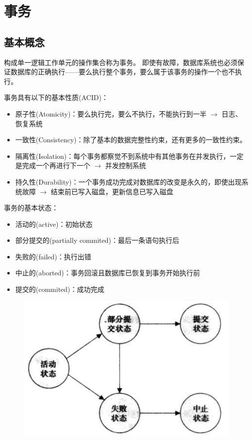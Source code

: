 
\section{事务} %
\subsection{基本概念}
\begin{definition}[事务(transaction)]
构成单一逻辑工作单元的操作集合称为事务。
即使有故障，数据库系统也必须保证数据库的正确执行——要么执行整个事务，要么属于该事务的操作一个也不执行。
\end{definition}

事务具有以下的基本性质(ACID)：
\begin{itemize}
	\item 原子性(Atomicity)：要么执行完，要么不执行，不能执行到一半 $\to$ 日志、恢复系统
	\item 一致性(Consistency)：除了基本的数据完整性约束，还有更多的一致性约束。
	\item 隔离性(Isolation)：每个事务都察觉不到系统中有其他事务在并发执行，一定是完成一个再进行下一个 $\to$ 并发控制系统
	\item 持久性(Durability)：一个事务成功完成对数据库的改变是永久的，即使出现系统故障 $\to$ 结束前已写入磁盘，更新信息已写入磁盘
\end{itemize}

事务的基本状态：
\begin{itemize}
	\item 活动的(active)：初始状态
	\item 部分提交的(partially commited)：最后一条语句执行后
	\item 失败的(failed)：执行出错
	\item 中止的(aborted)：事务回滚且数据库已恢复到事务开始执行前
	\item 提交的(commited)：成功完成
\end{itemize}
\begin{figure}[H]
\centering
\includegraphics[width=0.3\linewidth]{fig/transaction_state.png}
\end{figure}

